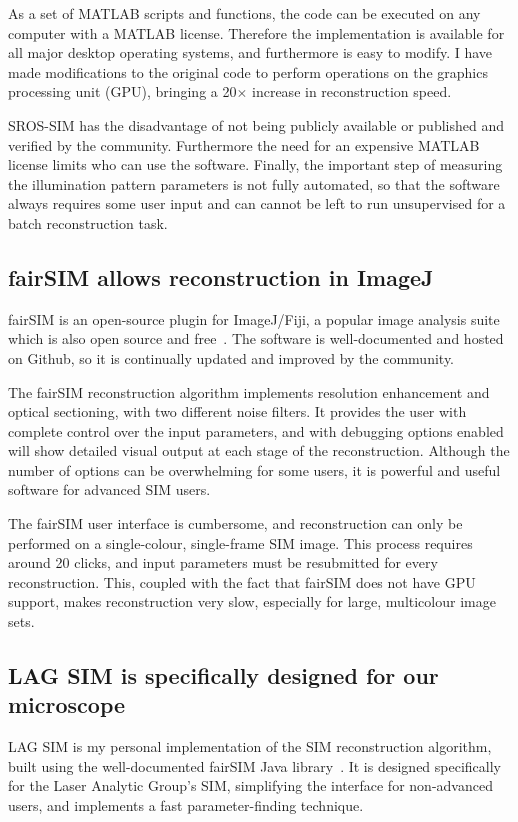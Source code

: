 As a set of MATLAB scripts and functions, the code can be executed on any computer with a MATLAB license.
Therefore the implementation is available for all major desktop operating systems, and furthermore is easy to modify.
I have made modifications to the original code to perform operations on the graphics processing unit (GPU), bringing a 20$\times$ increase in reconstruction speed.

SROS-SIM has the disadvantage of not being publicly available or published and verified by the community.
Furthermore the need for an expensive MATLAB license limits who can use the software.
Finally, the important step of measuring the illumination pattern parameters is not fully automated, so that the software always requires some user input and can cannot be left to run unsupervised for a batch reconstruction task.

\subsection{fairSIM allows reconstruction in ImageJ}
fairSIM is an open-source plugin for ImageJ/Fiji, a popular image analysis suite which is also open source and free~\cite{muller2016open, schindelin2012fiji}.
The software is well-documented and hosted on Github, so it is continually updated and improved by the community.

The fairSIM reconstruction algorithm implements resolution enhancement and optical sectioning, with two different noise filters.
It provides the user with complete control over the input parameters, and with debugging options enabled will show detailed visual output at each stage of the reconstruction.
Although the number of options can be overwhelming for some users, it is powerful and useful software for advanced SIM users.

The fairSIM user interface is cumbersome, and reconstruction can only be performed on a single-colour, single-frame SIM image.
This process requires around 20 clicks, and input parameters must be resubmitted for every reconstruction.
This, coupled with the fact that fairSIM does not have GPU support, makes reconstruction very slow, especially for large, multicolour image sets.


\subsection{LAG SIM is specifically designed for our microscope}
LAG SIM is my personal implementation of the SIM reconstruction algorithm, built using the well-documented fairSIM Java library~\cite{fairsimGithub}.
It is designed specifically for the Laser Analytic Group's SIM, simplifying the interface for non-advanced users, and implements a fast parameter-finding technique.


